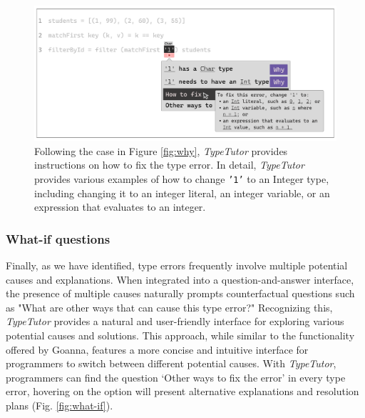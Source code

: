 \begin{figure}[hbt]
  \includegraphics[width=\linewidth]{How}
  \caption{
    \label{fig:how}
    Following the case in Figure \ref{fig:why}, \textit{TypeTutor} provides instructions on how to fix the type error. In detail,  \textit{TypeTutor} provides various examples of how to change \texttt{'1'} to an Integer type, including changing it to an integer literal, an integer variable, or an expression that evaluates to an integer.
    }
\end{figure}

\subsubsection{What-if questions}
Finally, as we have identified, type errors frequently involve multiple potential causes and explanations. When integrated into a question-and-answer interface, the presence of multiple causes naturally prompts counterfactual questions such as "What are other ways that can cause this type error?" Recognizing this, \textit{TypeTutor} provides a natural and user-friendly interface for exploring various potential causes and solutions. This approach, while similar to the functionality offered by Goanna, features a more concise and intuitive interface for programmers to switch between different potential causes. With \textit{TypeTutor}, programmers can find the question `Other ways to fix the error' in every type error,  hovering on the option will present alternative explanations and resolution plans (Fig. \ref{fig:what-if}).

